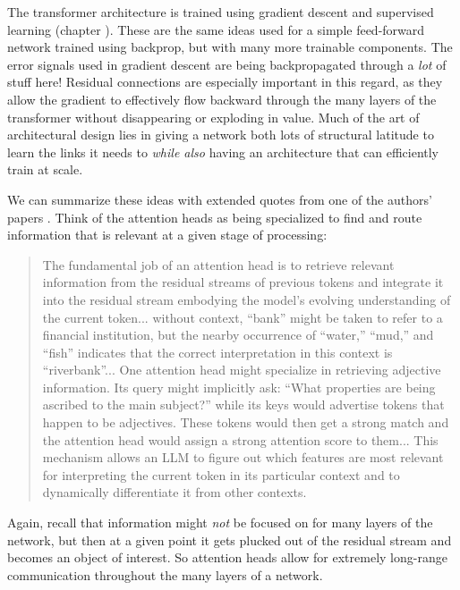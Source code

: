 The transformer architecture is trained using gradient descent and supervised
learning (chapter ). These are the same ideas used for a
simple feed-forward network trained using backprop, but with many more
trainable components. The error signals used in gradient descent are being
backpropagated through a \emph{lot} of stuff here! Residual connections are
especially important in this regard, as they allow the gradient to effectively flow
backward through the many layers of the transformer without disappearing or
exploding in value. Much of the art of
architectural design lies in giving a network both lots of structural latitude
to learn the links it needs to \emph{while also} having an architecture that can
efficiently train at scale.

We can summarize these ideas with extended quotes from one of the authors' papers \cite{beckmann2025mechanistic}. Think of the attention heads as being specialized to find and route information that is relevant at a given stage of processing:
\begin{quote}
The fundamental job of an attention head is to retrieve relevant information from the residual streams of previous tokens and integrate it into the residual stream embodying the model's evolving understanding of the current token... without context, ``bank'' might be taken to refer to a financial institution, but the nearby occurrence of ``water,'' ``mud,'' and ``fish'' indicates that the correct interpretation in this context is ``riverbank''... One attention head might specialize in retrieving adjective information. Its query might implicitly ask: ``What properties are being ascribed to the main subject?'' while its keys would advertise tokens that happen to be adjectives. These tokens would then get a strong match and the attention head would assign a strong attention score to them... This mechanism allows an LLM to figure out which features are most relevant for interpreting the current token in its particular context and to dynamically differentiate it from other contexts.
\end{quote}
Again, recall that information might \emph{not} be focused on for many layers of the network, but then at a given point it gets plucked out of the residual stream and becomes an object of interest. So attention heads allow for extremely long-range communication throughout the many layers of a network.

